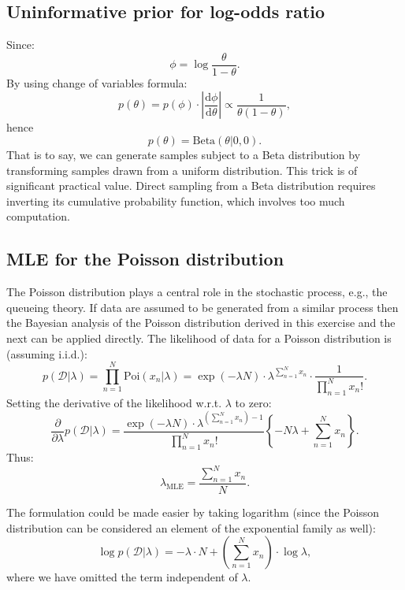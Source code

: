 \documentclass[UTF8]{ctexart}
\begin{document}
\subsection{Uninformative prior for log-odds ratio}
Since:
$$\phi=\log \frac{\theta}{1-\theta}.$$
By using change of variables formula:
$$p(\theta)=p(\phi)\cdot |\frac{\text{d}\phi}{\text{d}\theta}| \propto \frac{1}{\theta(1-\theta)},$$
hence
$$p(\theta)=\text{Beta}(\theta|0,0).$$
That is to say, we can generate samples subject to a Beta distribution by transforming samples drawn from a uniform distribution.
This trick is of significant practical value.
Direct sampling from a Beta distribution requires inverting its cumulative probability function, which involves too much computation.

\subsection{MLE for the Poisson distribution}
The Poisson distribution plays a central role in the stochastic process, e.g., the queueing theory.
If data are assumed to be generated from a similar process then the Bayesian analysis of the Poisson distribution derived in this exercise and the next can be applied directly.
The likelihood of data for a Poisson distribution is (assuming i.i.d.):
$$p(\mathcal{D}|\lambda)=\prod_{n=1}^{N}\text{Poi}(x_{n}|\lambda) = \exp(-\lambda N)\cdot \lambda^{\sum_{n=1}^{N}x_{n}}\cdot\frac{1}{\prod_{n=1}^{N}x_{n}!}.$$
Setting the derivative of the likelihood w.r.t. $\lambda$ to zero:
$$\frac{\partial}{\partial \lambda}p(\mathcal{D}|\lambda) = \frac{\exp(-\lambda N)\cdot \lambda^{(\sum_{n=1}^{N} x_{n})- 1}}{\prod_{n=1}^{N}x_{n}!}\left\{ -N\lambda + \sum_{n=1}^{N}x_{n} \right\}.$$
Thus:
$$\lambda_{\text{MLE}} = \frac{\sum_{n=1}^{N}x_{n}}{N}.$$

The formulation could be made easier by taking logarithm (since the Poisson distribution can be considered an element of the exponential family as well):
$$\log p(\mathcal{D}|\lambda)=-\lambda\cdot N+\left(\sum_{n=1}^{N} x_{n}\right)\cdot \log \lambda,$$
where we have omitted the term independent of $\lambda$.
\end{document}
